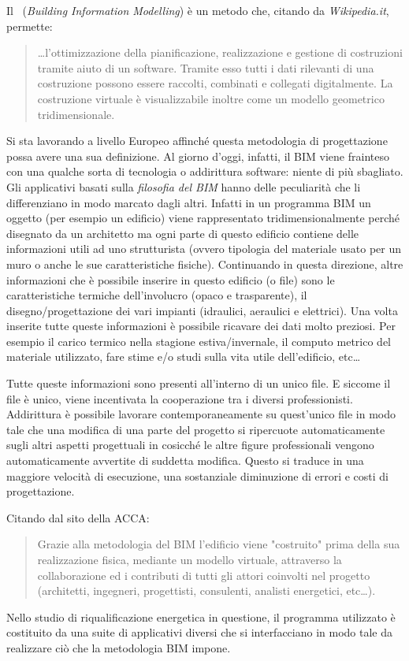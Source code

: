 Il \bim\ (\emph{Building Information Modelling}) è un metodo che, citando da \textit{Wikipedia.it}, permette:
\begin{quote}
	 \dots l'ottimizzazione della pianificazione, realizzazione e gestione di costruzioni tramite aiuto di un software. Tramite esso tutti i dati rilevanti di una costruzione possono essere raccolti, combinati e collegati digitalmente. La costruzione virtuale è visualizzabile inoltre come un modello geometrico tridimensionale.%
\end{quote}
Si sta lavorando a livello Europeo affinché questa metodologia di progettazione possa avere una sua definizione. Al giorno d'oggi, infatti, il BIM viene frainteso con una qualche sorta di tecnologia o addirittura software: niente di più sbagliato. Gli applicativi basati sulla \emph{filosofia del BIM} hanno delle peculiarità che li differenziano in modo marcato dagli altri. Infatti in un programma BIM un oggetto (per esempio un edificio) viene rappresentato tridimensionalmente perché disegnato da un architetto ma ogni parte di questo edificio contiene delle informazioni utili ad uno strutturista (ovvero tipologia del materiale usato per un muro o anche le sue caratteristiche fisiche). Continuando in questa direzione, altre informazioni che è possibile inserire in questo edificio (o file) sono le caratteristiche termiche dell'involucro (opaco e trasparente), il disegno/progettazione dei vari impianti (idraulici, aeraulici e elettrici). Una volta inserite tutte queste informazioni è possibile ricavare dei dati molto preziosi. Per esempio il carico termico nella stagione estiva/invernale, il computo metrico del materiale utilizzato, fare stime e/o studi sulla vita utile dell'edificio, etc\dots

Tutte queste informazioni sono presenti all'interno di un unico file. E siccome il file è unico, viene incentivata la cooperazione tra i diversi professionisti. Addirittura è possibile lavorare contemporaneamente su quest'unico file in modo tale che una modifica di una parte del progetto si ripercuote automaticamente sugli altri aspetti progettuali in cosicché le altre figure professionali vengono automaticamente avvertite di suddetta modifica. Questo si traduce in una maggiore velocità di esecuzione, una sostanziale diminuzione di errori e costi di progettazione.

Citando dal sito della ACCA:
\begin{quote}
	Grazie alla metodologia del BIM l'edificio viene "costruito" prima della sua realizzazione fisica, mediante un modello virtuale, attraverso la collaborazione ed i contributi di tutti gli attori coinvolti nel progetto (architetti, ingegneri, progettisti, consulenti, analisti energetici, etc\dots).
\end{quote}
Nello studio di riqualificazione energetica in questione, il programma utilizzato è costituito da una suite di applicativi diversi che si interfacciano in modo tale da realizzare ciò che la metodologia BIM impone.


